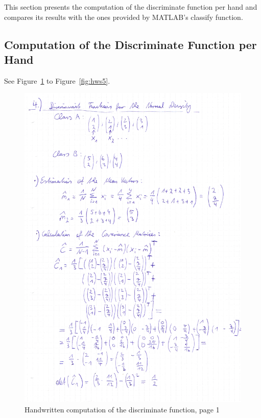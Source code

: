 \documentclass[subfigure,epsfig,fleqn,amssmb,float,caption,ausarbeitung]{scrartcl}
\begin{document}
This section presents the computation of the discriminate function per hand and compares its results with the ones provided by MATLAB's classify function.


\subsection{Computation of the Discriminate Function per Hand}
\label{sec:Hand}

See Figure~\ref{fig:hws1} to Figure~\ref{fig:hws5}.
\begin{figure}
\includegraphics[width=14cm]{img/discriminantFunction1.jpg}
	\caption{Handwritten computation of the discriminate function, page 1}
	\label{fig:hws1}
\end{figure}
\end{document}
